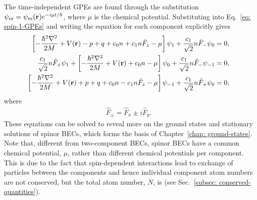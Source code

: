 The time-independent GPEs are found through the substitution
\(\psi_m = \psi_m(\vb{r})e^{-i\mu t/\hbar}\), where \(\mu \) is the chemical
potential.
Substituting into Eq.~\eqref{eq: spin-1-GPEs} and writing the equation for
each component explicitly gives
\begin{align}\label{eq: spin-1-GPEs-dimensional-psi1}
    \left[-\frac{\hbar^2\nabla^2}{2M} + V(\vb{r}) - p + q + c_0n + c_1n\hat{F}_z
    - \mu\right]\psi_1 + \frac{c_1}{\sqrt{2}}n\hat{F}_-\psi_0    &= 0,  \\
    \frac{c_1}{\sqrt{2}}n\hat{F}_+\psi_1 + \left[-\frac{\hbar^2\nabla^2}{2M}
        + V(\vb{r}) + c_0n - \mu\right]\psi_0
        + \frac{c_1}{\sqrt{2}}n\hat{F}_-\psi_{-1} &= 0,  \\
    \left[-\frac{\hbar^2\nabla^2}{2M} + V(\vb{r}) + p + q + c_0n - c_1n\hat{F}_z
    - \mu\right]\psi_{-1} + \frac{c_1}{\sqrt{2}}n\hat{F}_+\psi_0 &= 0,
    \label{eq: spin-1-GPEs-dimensional-psim1}
\end{align}
where
\begin{align}
    \hat{F}_{\pm} = \hat{F}_x \pm i\hat{F}_y.
\end{align}
These equations can be solved to reveal more on the ground states and stationary
solutions of spinor BECs, which forms the basis of
Chapter~\ref{chap: ground-states}.
Note that, different from two-component BECs, spinor BECs have a common chemical
potential, \(\mu\), rather than different chemical potentials per component.
This is due to the fact that spin-dependent interactions lead to exchange of
particles between the components and hence individual component atom numbers
are not conserved, but the total atom number, \(N\), is (see
Sec.~\ref{subsec: conserved-quantities}).

